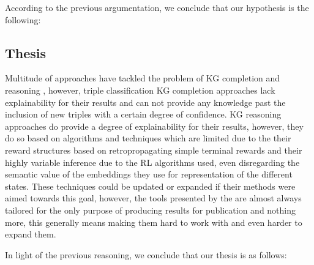 According to the previous argumentation, we conclude that our hypothesis is the following:



\subsection{Thesis}

Multitude of approaches have tackled the problem of KG completion \cite{} and reasoning \cite{}, however, triple classification KG completion approaches lack explainability for their results and can not provide any knowledge past the inclusion of new triples with a certain degree of confidence. KG reasoning approaches do provide a degree of explainability for their results, however, they do so based on algorithms and techniques which are limited due to the their reward structures based on retropropagating simple terminal rewards and their highly variable inference due to the RL algorithms used, even disregarding the semantic value of the embeddings they use for representation of the different states. These techniques could be updated or expanded if their methods were aimed towards this goal, however, the tools presented by the are almost always tailored for the only purpose of producing results for publication and nothing more, this generally means making them hard to work with and even harder to expand them.

In light of the previous reasoning, we conclude that our thesis is as follows:


